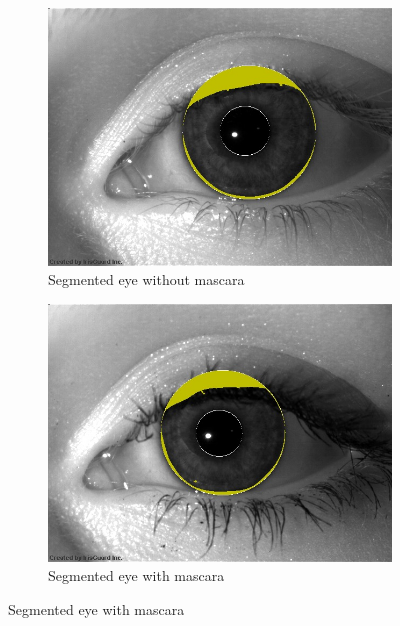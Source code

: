 \documentclass[10pt,twocolumn,letterpaper]{article}
\begin{document}
\begin{figure}[!ht]
\begin{subfigure}[b]{0.49\linewidth}
        \label{fig:eyemasc}
    \end{subfigure}
    \\
    \begin{subfigure}[b]{0.49\linewidth}
        \centering
        \includegraphics[width=\textwidth]{img/bxgrid-863204-segmented.jpg}
        \caption{Segmented eye without mascara}
        \label{fig:eyesegwo}
    \end{subfigure}
    \hfill
    \begin{subfigure}[b]{0.49\linewidth}
        \centering
        \includegraphics[width=\textwidth]{img/bxgrid-822674-segmented.jpg}
        \caption{Segmented eye with mascara}
        \label{fig:eyesegwo}
    \end{subfigure}

\end{figure}
\end{document}
